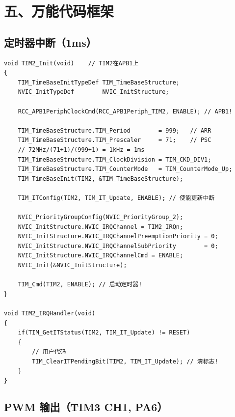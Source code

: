 \documentclass[10pt,a4paper,oneside]{ctexart}
\begin{document}
\section*{五、万能代码框架}

\subsection*{定时器中断（1ms）}

\begin{codebox}
\begin{lstlisting}[style=stm32, numbers=none]
void TIM2_Init(void)    // TIM2在APB1上
{
    TIM_TimeBaseInitTypeDef TIM_TimeBaseStructure;
    NVIC_InitTypeDef        NVIC_InitStructure;

    RCC_APB1PeriphClockCmd(RCC_APB1Periph_TIM2, ENABLE); // APB1!

    TIM_TimeBaseStructure.TIM_Period        = 999;   // ARR
    TIM_TimeBaseStructure.TIM_Prescaler     = 71;    // PSC
    // 72MHz/(71+1)/(999+1) = 1kHz = 1ms
    TIM_TimeBaseStructure.TIM_ClockDivision = TIM_CKD_DIV1;
    TIM_TimeBaseStructure.TIM_CounterMode   = TIM_CounterMode_Up;
    TIM_TimeBaseInit(TIM2, &TIM_TimeBaseStructure);

    TIM_ITConfig(TIM2, TIM_IT_Update, ENABLE); // 使能更新中断

    NVIC_PriorityGroupConfig(NVIC_PriorityGroup_2);
    NVIC_InitStructure.NVIC_IRQChannel = TIM2_IRQn;
    NVIC_InitStructure.NVIC_IRQChannelPreemptionPriority = 0;
    NVIC_InitStructure.NVIC_IRQChannelSubPriority        = 0;
    NVIC_InitStructure.NVIC_IRQChannelCmd = ENABLE;
    NVIC_Init(&NVIC_InitStructure);

    TIM_Cmd(TIM2, ENABLE); // 启动定时器!
}

void TIM2_IRQHandler(void)
{
    if(TIM_GetITStatus(TIM2, TIM_IT_Update) != RESET)
    {
        // 用户代码
        TIM_ClearITPendingBit(TIM2, TIM_IT_Update); // 清标志!
    }
}
\end{lstlisting}
\end{codebox}

\subsection*{PWM 输出（TIM3 CH1, PA6）}
\end{document}
